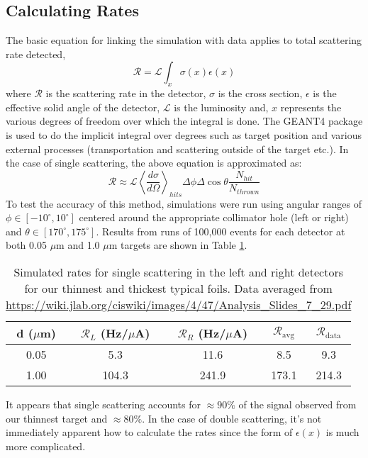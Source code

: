 \documentclass[11pt]{article}
\begin{document}
\subsection{Calculating Rates}
The basic equation for linking the simulation with data applies to total scattering rate detected,
\begin{equation}
 \mathcal{R} = \mathcal{L} \int_x \sigma(x)\epsilon(x)
\end{equation}
where $\mathcal{R}$ is the scattering rate in the detector, $\sigma$ is the cross section, $\epsilon$ is the effective solid angle of the detector, $\mathcal{L}$ is the luminosity and, $x$ represents the various degrees of freedom over which the integral is done. The GEANT4 package is used to do the implicit integral over degrees such as target position and various external processes (transportation and scattering outside of the target etc.). In the case of single scattering, the above equation is approximated as:
\begin{equation}
 \mathcal{R} \approx \mathcal{L} \left\langle\frac{d\sigma}{d\Omega}\right\rangle_{hits} \Delta\phi \Delta\cos\theta \frac{N_{hit}}{N_{thrown}}
\end{equation}
To test the accuracy of this method, simulations were run using angular ranges of $\phi \in [-10^\circ,10^\circ]$ centered around the appropriate collimator hole (left or right) and $\theta \in [170^\circ,175^\circ]$. Results from runs of 100,000 events for each detector at both 0.05 $\mu$m and 1.0 $\mu$m targets are shown in Table \ref{table:SimulatedRates}.

\begin{table} [h!]
 \centering
 \begin{tabular}{| c | c | c | c | c |} 
  \hline d ($\mu$m) & $\mathcal{R}_L$ (Hz/$\mu$A) & $\mathcal{R}_R$ (Hz/$\mu$A) & $\mathcal{R}_\mathrm{avg}$ & $\mathcal{R}_\mathrm{data}$ \\
  \hline 0.05 & 5.3 & 11.6 & 8.5 & 9.3\\ 
  \hline 1.00 & 104.3 & 241.9 & 173.1 & 214.3 \\
  \hline
 \end{tabular}
 \caption{Simulated rates for single scattering in the left and right detectors for our thinnest and thickest typical foils. Data averaged from \url{https://wiki.jlab.org/ciswiki/images/4/47/Analysis_Slides_7_29.pdf}}
 \label{table:SimulatedRates}
\end{table}
It appears that single scattering accounts for $\approx 90\%$ of the signal observed from our thinnest target and $\approx 80\%$.
In the case of double scattering, it's not immediately apparent how to calculate the rates since the form of $\epsilon(x)$ is much more complicated.
\end{document}
